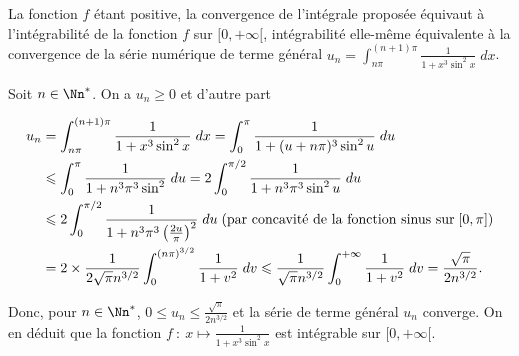 {\begin{enumerate}
{La fonction $f$ étant positive, la convergence de l'intégrale proposée équivaut à l'intégrabilité de la fonction $f$ sur $[0,+\infty[$, intégrabilité elle-même équivalente à la convergence de la série numérique de terme général $u_n =\int_{n\pi}^{(n+1)\pi}\frac{1}{1+x^3\sin^2x}\;dx$.



Soit $n\in\Nn^*$. On a $u_n\geqslant0$ et d'autre part



\begin{align*}\ensuremath

u_n&=\int_{n\pi}^{(n+1)\pi}\frac{1}{1+x^3\sin^2x}\;dx=\int_{0}^{\pi}\frac{1}{1+(u+n\pi)^3\sin^2u}\;du\\

 &\leqslant\int_{0}^{\pi}\frac{1}{1+n^3\pi^3\sin^2}\;du = 2\int_{0}^{\pi/2}\frac{1}{1+n^3\pi^3\sin^2u}\;du\\

 &\leqslant2\int_{0}^{\pi/2}\frac{1}{1+n^3\pi^3\left(\frac{2u}{\pi}\right)^2}\;du\;(\text{par concavité de la fonction sinus sur}\;[0,\pi])\\

 &= 2\times\frac{1}{2\sqrt{\pi}n^{3/2}}\int_{0}^{(n\pi)^{3/2}}\frac{1}{1+v^2}\;dv\leqslant\frac{1}{\sqrt{\pi}n^{3/2}}\int_{0}^{+\infty}\frac{1}{1+v^2}\;dv =\frac{\sqrt{\pi}}{2n^{3/2}}.

\end{align*}



	

Donc, pour $n\in\Nn^*$, $0\leqslant u_n\leqslant\frac{\sqrt{\pi}}{2n^{3/2}}$ et la série de terme général $u_n$ converge. On en déduit que la fonction $f~:~x\mapsto\frac{1}{1+x^3\sin^2x}$ est intégrable sur $[0,+\infty[$.}
\end{enumerate}
}